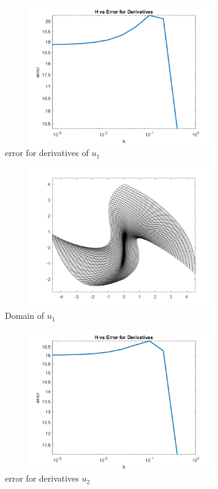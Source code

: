 \documentclass[12pt]{article}
\begin{document}
		\begin{figure}
			\centering
			\includegraphics[width=100mm,height=60mm]{error1.png}
			\caption{error for derivatives of $u_1$}
		\end{figure}
		\vspace{1in}
		\begin{figure}
			\centering
			\includegraphics[width=100mm,height=60mm]{function1.png}
			\caption{Domain of $u_1$}
		\end{figure}
		\begin{figure}
			\centering
			\includegraphics[width=100mm,height=60mm]{error2.png}
			\caption{error for derivatives $u_{2}$}
		\end{figure}
		
\end{document}
